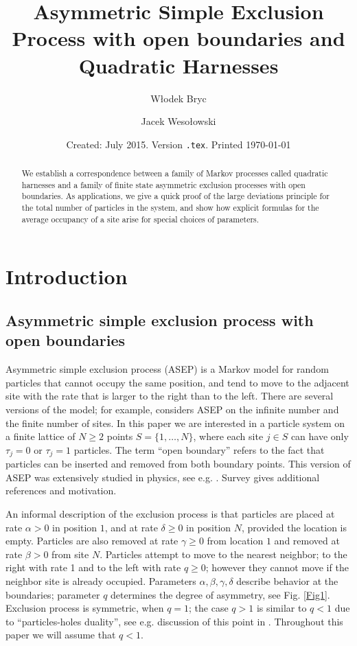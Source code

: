 \documentclass{amsart}
\title[ASEP and Quadratic Harnesses]{Asymmetric Simple Exclusion Process  with open boundaries and Quadratic Harnesses }
\author{
W{\l}odek  Bryc
}
\author{Jacek Weso{\l}owski}
\date{Created: July 2015. Version {\tt \jobname.tex}. Printed \today}
\theoremstyle{definition}
\theoremstyle{remark}
\theoremstyle{remark}
\theoremstyle{definition}
\numberwithin{equation}{section}
\begin{document}
\maketitle
\begin{abstract}
We establish a correspondence   between a family of Markov processes called
quadratic harnesses and a family of finite state asymmetric exclusion processes   with open boundaries.   As  applications, we give a quick proof of
the large deviations principle  for the total number of particles in the system,   and 
show how  explicit formulas for the average occupancy of a site arise for special choices of parameters.
\end{abstract}

\section{Introduction}
\subsection{Asymmetric simple exclusion process with open boundaries}
Asymmetric simple exclusion process (ASEP) is a Markov model for  random particles that cannot occupy the same position, and tend to move to the adjacent site with the rate that is larger to the
right   than to the left.
There are several versions of the model; for example, \citet{spitzer1970interaction} considers ASEP on the infinite number and the finite number of sites.  In this paper
we are interested in a particle system on a finite lattice of $N\geq 2$ points $S=\{1,\dots,N\}$,
 where each site $j\in S$ can have only $\tau_j=0$ or $\tau_j=1$ particles. The term ``open boundary''
refers to the fact that particles can be inserted and removed from both boundary points.
This version of ASEP was extensively studied in physics,
  see e.g. \cite{bertini2002macroscopic,blythe2000exact,derrida1992exact,derrida2004current,derrida1993exact,derrida2001free,derrida2002exact}. Survey \citet{blythe2007nonequilibrium} gives additional references and motivation.

  An informal description of the exclusion process is that particles are placed at rate $\alpha>0$
in position $1$, and at rate $\delta\geq 0$ in position $N$, provided the location is empty. Particles are also removed at rate $\gamma\geq 0$  from
location $1$ and removed  at rate $\beta>0$ from  site $N$.
Particles attempt to move to the nearest neighbor; to the right with rate 1 and to the left with rate $q\geq 0$; however they cannot move if the neighbor site is already occupied.
 Parameters $\alpha,\beta,\gamma,\delta$ describe behavior at the boundaries; parameter $q$ determines the degree of asymmetry, see Fig. \ref{Fig1}.
 Exclusion process is symmetric, when
 $q=1$; the case $q>1$ is similar to  $q<1$ due to ``particles-holes duality'', see e.g. discussion of this  point in
 \cite{uchiyama2004asymmetric}.  Throughout this paper we will assume that $q<1$.
\end{document}
